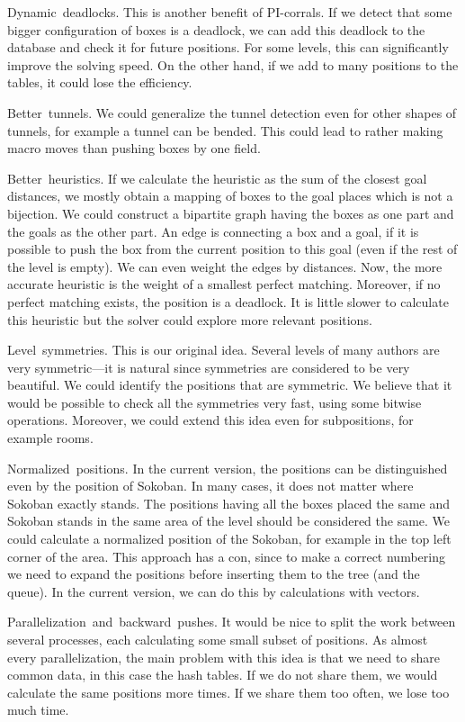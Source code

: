 \documentclass[twocolumn]{article}
\newcommand{\heading}[1]{\smallbreak\par\noindent\hbox{\mybf #1}}
\begin{document}
\heading{Dynamic deadlocks.} This is another benefit of PI-corrals. If we detect that some bigger configuration of boxes is a deadlock, we can add this
deadlock to the database and check it for future positions. For some levels, this can significantly improve the solving speed. On the other hand, if
we add to many positions to the tables, it could lose the efficiency.

\heading{Better tunnels.} We could generalize the tunnel detection even for other shapes of tunnels, for example a tunnel can be bended. This could
lead to rather making macro moves than pushing boxes by one field.

\heading{Better heuristics.} If we calculate the heuristic as the sum of the closest goal distances, we mostly obtain a mapping of boxes to the goal places
which is not a bijection. We could construct a bipartite graph having the boxes as one part and the goals as the other part. An edge is connecting a
box and a goal, if it is possible to push the box from the current position to this goal (even if the rest of the level is empty). We can even weight
the edges by distances.  Now, the more accurate heuristic is the weight of a smallest perfect matching. Moreover, if no perfect matching exists, the
position is a deadlock. It is little slower to calculate this heuristic but the solver could explore more relevant positions.

\heading{Level symmetries.} This is our original idea. Several levels of many authors are very symmetric---it is natural since symmetries are
considered to be very beautiful. We could identify the positions that are symmetric. We believe that it would be possible to check all the symmetries
very fast, using some bitwise operations. Moreover, we could extend this idea even for subpositions, for example rooms.

\heading{Normalized positions.} In the current version, the positions can be distinguished even by the position of Sokoban. In many cases, it does not
matter where Sokoban exactly stands. The positions having all the boxes placed the same and Sokoban stands in the same area of the level should be
considered the same. We could calculate a normalized position of the Sokoban, for example in the top left corner of the area. This approach has a con,
since to make a correct numbering we need to expand the positions before inserting them to the tree (and the queue). In the current
version, we can do this by calculations with vectors.

\heading{Parallelization and backward pushes.} It would be nice to split the work between several processes, each calculating some small subset of
positions. As almost every parallelization, the main problem with this idea is that we need to share common data, in this case the hash tables.
If we do not share them, we would calculate the same positions more times. If we share them too often, we lose too much time.
\end{document}
